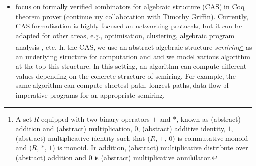 \documentclass[a4paper]{article}
\begin{document}
\begin{itemize}
\item focus on formally verified combinators for algebraic structure (CAS) in Coq theorem prover 
	(continue my collaboration with Timothy Griffin). 
	Currently, CAS formalisation is highly focused on networking protocols, but it can be 
	adapted for other areas, e.g., optimisation, clustering, algebraic program 
	analysis , etc. In the CAS, we use an abstract algebraic structure 
	\emph{semiring}\footnote{A set $R$ equipped with two binary operators $+$ and $*$, 
	known as (abstract) addition and (abstract) multiplication, $0$, (abstract) additive identity, 
	$1$, (abstract) multiplicative identity such that 
	($R$, $+$, $0$) is commutative monoid and ($R$, $*$, $1$) is monoid. 
	In addition, (abstract) multiplicative distribute over (abstract)  addition and 
	$0$ is (abstract) multiplicative annihilator.} as an underlying structure
	for computation and and we model various algorithm at the top this 
	structure. In this setting, an algorithm can compute different values depending 
	on the concrete structure of semiring. For example, the same algorithm 
	can compute shortest path, longest paths, 
	data flow of imperative programs \cite{gondran2008graphs, 10.1145/2500365.2500613} for 
	an appropriate semiring.
	

\end{itemize}



 

\end{document}
